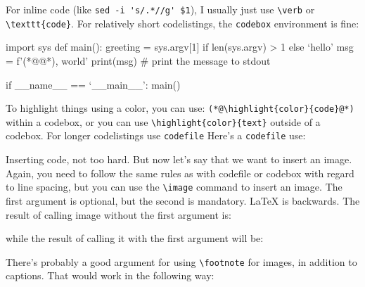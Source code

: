 \documentclass{writeup}
\author{Kevin Sprague}
\begin{document}

\begin{walkthrough}
\step
For inline code (like \verb`sed -i 's/.*//g' $1`), I usually just use \verb|\verb| or \verb|\texttt{code}|. For relatively short codelistings, the \verb|codebox| environment is fine:

\begin{codebox}[language=Python]
import sys
def main():
    greeting = sys.argv[1] if len(sys.argv) > 1 else `hello'
    msg = f'{(*@@*)}, world'
    print(msg) # print the message to stdout

if __name__ == `__main__':
    main()
\end{codebox}

To highlight things using a color, you can use: \verb|(*@\highlight{color}{code}@*)| within a codebox, or you can use \verb|\highlight{color}{text}| outside of a codebox.
\bigbreak
For longer codelistings use \verb|codefile|
\step
Here's a \verb|codefile| use:


\step
Inserting code, not too hard. But now let's say that we want to insert an image. Again, you need to follow the same rules as with codefile or codebox with regard to line spacing, but you can use the \verb|\image| command to insert an image. The first argument is optional, but the second is mandatory. LaTeX is backwards. The result of calling image without the first argument is:


while the result of calling it with the first argument will be: 


There's probably a good argument for using \verb|\footnote| for images, in addition to captions. That would work in the following way:


\end{walkthrough}
\end{document}
